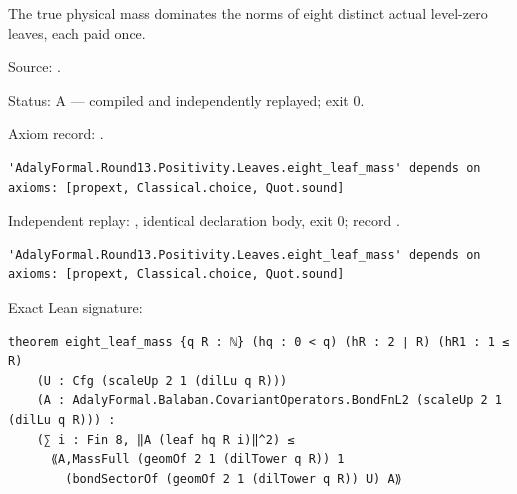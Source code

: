 \begin{theorem}[bp-446]
\label{bp-446}
\leanok
The true physical mass dominates the norms of eight distinct actual level-zero leaves, each paid once.

\par Source: \texttt{}.
\par Status: A — compiled and independently replayed; exit 0.
\par Axiom record: \texttt{}.
\begin{verbatim}
'AdalyFormal.Round13.Positivity.Leaves.eight_leaf_mass' depends on axioms: [propext, Classical.choice, Quot.sound]
\end{verbatim}
\par Independent replay: \texttt{}, identical declaration body, exit 0; record \texttt{}.
\begin{verbatim}
'AdalyFormal.Round13.Positivity.Leaves.eight_leaf_mass' depends on axioms: [propext, Classical.choice, Quot.sound]
\end{verbatim}
\par Exact Lean signature:
\begin{verbatim}
theorem eight_leaf_mass {q R : ℕ} (hq : 0 < q) (hR : 2 ∣ R) (hR1 : 1 ≤ R)
    (U : Cfg (scaleUp 2 1 (dilLu q R)))
    (A : AdalyFormal.Balaban.CovariantOperators.BondFnL2 (scaleUp 2 1 (dilLu q R))) :
    (∑ i : Fin 8, ‖A (leaf hq R i)‖^2) ≤
      ⟪A,MassFull (geomOf 2 1 (dilTower q R)) 1
        (bondSectorOf (geomOf 2 1 (dilTower q R)) U) A⟫
\end{verbatim}
\end{theorem}

